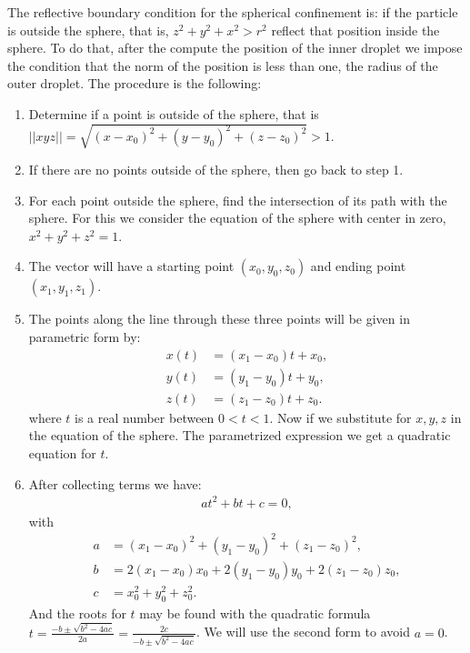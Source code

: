 \documentclass[%
10pt,
superscriptaddress,
twocolumn,
 amsmath,amssymb,
 aps,prx,
]{revtex4-2}
\begin{document}
The reflective boundary condition for the spherical confinement is: if the particle is outside the sphere, that is, $z^2+y^2+x^2>r^2$ reflect that position inside the sphere. 
To do that, after the compute the position of the inner droplet we impose the condition that the norm of the position is less than one, the radius of the outer droplet. 
The procedure is the following:
\begin{enumerate}
    \item Determine if a point is outside of the sphere, that is \\ $||xyz|| = \sqrt{(x-x_0)^2+(y-y_0)^2+(z-z_0)^2} > 1$.
    \item If there are no points outside of the sphere, then go back to step 1.
    \item For each point outside the sphere, find the intersection of its path with the sphere. For this we consider the equation of the sphere with center in zero, $x^2+y^2+z^2=1$.
    \item The vector will have a starting point $(x_0,y_0,z_0)$ and ending point $(x_1,y_1,z_1)$.
    \item The points along the line through these three points will be given in parametric form by:
    \begin{align}
        x(t)&= (x_1-x_0)t+x_0,\\
        y(t)&=(y_1-y_0)t+y_0,\\
        z(t)&=(z_1-z_0)t+z_0.
    \end{align}
    where $t$ is a real number between $0<t<1$. Now if we substitute for $x,y,z$ in the equation of the sphere. The parametrized expression we get a quadratic equation for $t$.
    \item After collecting terms we have:
    \begin{align}
        at^2+bt+c=0,
    \end{align}
    with 
   \begin{align}
       a&=(x_1-x_0)^2+(y_1-y_0)^2+(z_1-z_0)^2,\\
       b&= 2(x_1-x_0)x_0+2(y_1-y_0)y_0+2(z_1-z_0)z_0,\\
       c&= x_0^2+y_0^2+z_0^2.
   \end{align} 
   And the roots for $t$ may be found with the quadratic formula                              $t=\frac{-b \pm \sqrt{b^2-4ac}}{2a}=\frac{2c}{-b \pm \sqrt{b^2-4ac}}$. We will use the second form to avoid $a=0$.


\end{enumerate}
\end{document}
